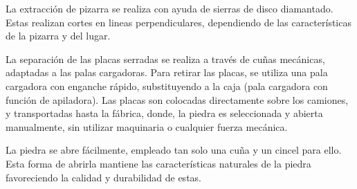 La extracción de pizarra se realiza con ayuda  de sierras de disco
diamantado. Estas realizan cortes en lineas perpendiculares, dependiendo de las características
de la pizarra y del lugar.

La separación de las placas serradas se realiza a través de cuñas
mecánicas, adaptadas a las palas cargadoras. Para retirar las
placas, se utiliza una pala cargadora con enganche rápido,
substituyendo a la caja (pala cargadora con función de apiladora).
Las placas son colocadas directamente sobre los camiones, y transportadas hasta la fábrica,
donde, la piedra es seleccionada y abierta manualmente, sin utilizar maquinaria o cualquier
fuerza mecánica.

La piedra se abre fácilmente, empleado tan solo una cuña y un cincel para ello. Esta forma de
abrirla mantiene las características naturales de la piedra favoreciendo la calidad y durabilidad
de estas.

